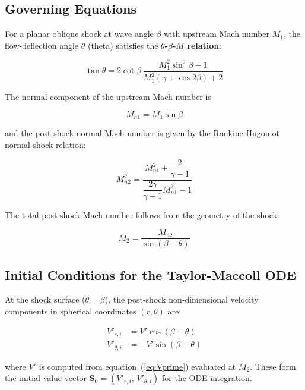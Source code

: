 \documentclass[12pt,a4paper]{article}
\begin{document}
\subsection{Governing Equations}

For a planar oblique shock at wave angle $\beta$ with upstream Mach number
$M_1$, the flow-deflection angle $\theta$ (theta) satisfies the
\textbf{$\theta$-$\beta$-$M$ relation}:

\begin{equation}
    \tan\theta = 2\cot\beta \,
    \frac{M_1^2 \sin^2\!\beta - 1}{M_1^2\!\left(\gamma + \cos 2\beta\right) + 2}
    \label{eq:theta_beta_M}
\end{equation}

The normal component of the upstream Mach number is

\begin{equation}
    M_{n1} = M_1 \sin\beta
    \label{eq:Mn1}
\end{equation}

and the post-shock normal Mach number is given by the Rankine-Hugoniot
normal-shock relation:

\begin{equation}
    M_{n2}^2 = \frac{M_{n1}^2 + \dfrac{2}{\gamma-1}}{\dfrac{2\gamma}{\gamma-1}M_{n1}^2 - 1}
    \label{eq:Mn2}
\end{equation}

The total post-shock Mach number follows from the geometry of the shock:

\begin{equation}
    M_2 = \frac{M_{n2}}{\sin(\beta - \theta)}
    \label{eq:M2}
\end{equation}

\subsection{Initial Conditions for the Taylor-Maccoll ODE}

At the shock surface ($\theta = \beta$), the post-shock non-dimensional velocity
components in spherical coordinates $(r, \theta)$ are:

\begin{align}
    V'_{r,i} &= V' \cos(\beta - \theta)
    \label{eq:Vri} \\
    V'_{\theta,i} &= -V' \sin(\beta - \theta)
    \label{eq:Vthetai}
\end{align}

where $V'$ is computed from equation~(\ref{eq:Vprime}) evaluated at $M_2$.
These form the initial value vector $\mathbf{S}_0 = (V'_{r,i},\,V'_{\theta,i})$
for the ODE integration.
\end{document}
